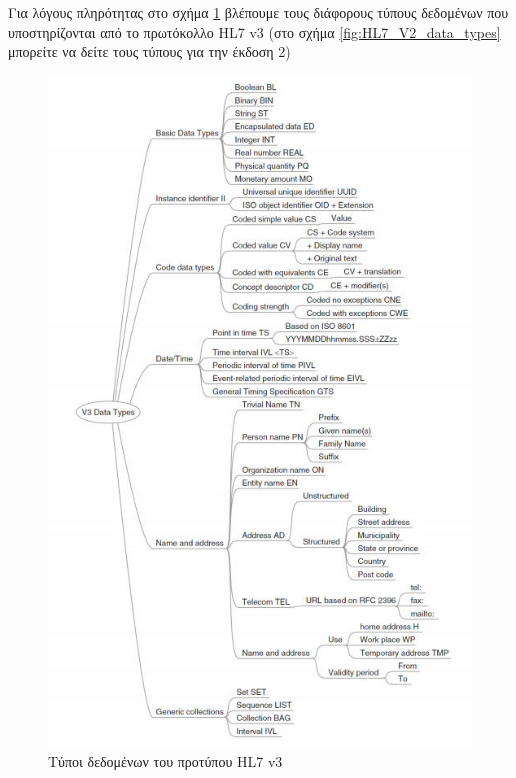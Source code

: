 	Για λόγους πληρότητας στο σχήμα \ref{fig:HL7_V3_data_types} βλέπουμε τους διάφορους τύπους δεδομένων που υποστηρίζονται από το πρωτόκολλο HL7 v3 (στο σχήμα \ref{fig:HL7_V2_data_types} μπορείτε να δείτε τους τύπους για την έκδοση 2)
\newpage
	\begin{figure}[H]
	    \centering
	    \includegraphics[width=1\textwidth]{HL7_V3_data_types.jpg}
	    \caption{Τύποι δεδομένων του προτύπου HL7 v3}
	    \label{fig:HL7_V3_data_types}
	\end{figure}
\newpage		
